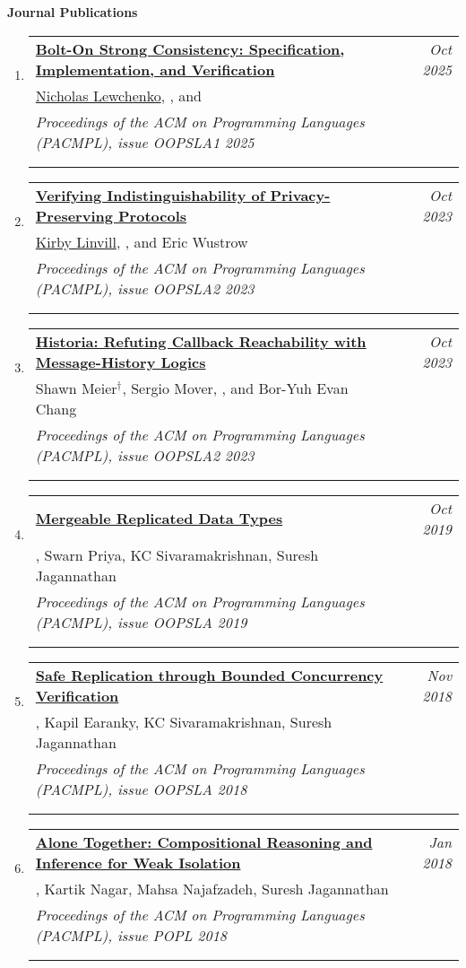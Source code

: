 \documentclass{article}
\makeatletter
\newenvironment{benumerate}[2]{
    \let\oldItem\item
    \def\item{\addtocounter{enumi}{-2}\oldItem}
    \begin{enumerate}[#2] \itemsep3pt
    \setcounter{enumi}{#1}
    \addtocounter{enumi}{1}}
  {\end{enumerate}}
\newenvironment{region}[3]{%
  {{\textbf{#1}}}
  \begin{benumerate}{#3}{\color{RoyalBlue}#2}}
  {\end{benumerate}\vspace{0.8ex}}
\newenvironment{publication}[6]
{ \item
  \begin{tabular*}{6.8in}{p{6in}@{\extracolsep{\fill}}r}
    \href{#1}{\textbf{#2}} & \textit{#3}\\ #4 &\\ \textit{#5}&\\
    \ifthenelse{\equal{#6}{}}{}{#6&\\}
  \end{tabular*}
} {}
\makeatother
\begin{document}
\begin{region} {Journal Publications}{{J}1}{7}

\begin{publication}{https://dl.acm.org/doi/10.1145/3720502}
		{Bolt-On Strong Consistency: Specification, Implementation, and Verification}
    {Oct 2025}{\underline{Nicholas Lewchenko}, \ugkaki, and \bec}
    {Proceedings of the ACM on Programming Languages (PACMPL), issue OOPSLA1
    2025}
    {Acceptance rate: 32\%}
\end{publication}

\begin{publication}{https://gowthamk.github.io/docs/oopsla23a.pdf}
		{Verifying Indistinguishability of Privacy-Preserving Protocols }
    {Oct 2023}{\underline{Kirby Linvill}, \ugkaki, and Eric Wustrow}
    {Proceedings of the ACM on Programming Languages (PACMPL), issue OOPSLA2
    2023}
    {Acceptance rate: 38\%}
\end{publication}

\begin{publication}{https://gowthamk.github.io/docs/oopsla23b.pdf}
		{Historia: Refuting Callback Reachability with Message-History Logics}
    {Oct 2023}{Shawn Meier$^\dag$, Sergio Mover, \ugkaki, and Bor-Yuh Evan Chang}
    {Proceedings of the ACM on Programming Languages (PACMPL), issue OOPSLA2
    2023}
    {Acceptance rate: 38\%}
\end{publication}

\begin{publication}{https://gowthamk.github.io/docs/mrdt.pdf}
		{Mergeable Replicated Data Types}
    {Oct 2019}{\ugkaki, Swarn Priya, KC Sivaramakrishnan, Suresh Jagannathan}
    {Proceedings of the ACM on Programming Languages (PACMPL), issue OOPSLA
    2019}
    {Acceptance rate: 36\%}
  \end{publication}

	\begin{publication}{https://gowthamk.github.io/docs/q9.pdf}
		{Safe Replication through Bounded Concurrency Verification}
    {Nov 2018}{\ugkaki, Kapil Earanky, KC Sivaramakrishnan, Suresh Jagannathan}
    {Proceedings of the ACM on Programming Languages (PACMPL), issue OOPSLA
    2018}
    {Acceptance rate: 28\%}
  \end{publication}

  \begin{publication}{https://gowthamk.github.io/docs/popl18.pdf}
    {Alone Together: Compositional Reasoning and Inference for Weak Isolation}
    {Jan 2018}
    {\ugkaki, Kartik Nagar, Mahsa Najafzadeh, Suresh Jagannathan}
    {Proceedings of the ACM on Programming Languages (PACMPL), issue POPL
    2018}
    {Acceptance rate: 24\%}
  \end{publication}


\end{region}
\end{document}
